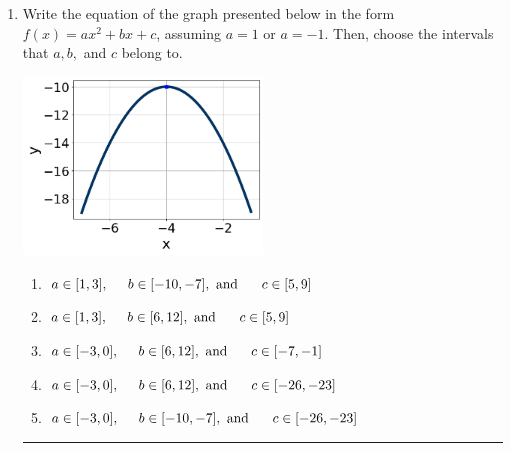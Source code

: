 \documentclass[14pt]{extbook}
\newcommand{\litem}[1]{\item#1\hspace*{-1cm}\rule{\textwidth}{0.4pt}}
\begin{document}
\begin{enumerate}
{\begin{enumerate}[label=\Alph*.]
\end{enumerate} }
\litem{
Write the equation of the graph presented below in the form $f(x)=ax^2+bx+c$, assuming  $a=1$ or $a=-1$. Then, choose the intervals that $a, b,$ and $c$ belong to.
\begin{center}
    \includegraphics[width=0.5\textwidth]{../Figures/quadraticGraphToEquationCopyA.png}
\end{center}
\begin{enumerate}[label=\Alph*.]
\item \( a \in [1, 3], \hspace*{5mm} b \in [-10, -7], \text{ and } \hspace*{5mm} c \in [5, 9] \)
\item \( a \in [1, 3], \hspace*{5mm} b \in [6, 12], \text{ and } \hspace*{5mm} c \in [5, 9] \)
\item \( a \in [-3, 0], \hspace*{5mm} b \in [6, 12], \text{ and } \hspace*{5mm} c \in [-7, -1] \)
\item \( a \in [-3, 0], \hspace*{5mm} b \in [6, 12], \text{ and } \hspace*{5mm} c \in [-26, -23] \)
\item \( a \in [-3, 0], \hspace*{5mm} b \in [-10, -7], \text{ and } \hspace*{5mm} c \in [-26, -23] \)

\end{enumerate} }
\end{enumerate}
\end{document}
